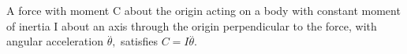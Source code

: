  A force with moment C about the origin acting on a body
with constant moment of inertia I about an axis through the origin 
perpendicular to the force, with angular acceleration 
$ \overset{..}{\theta} , $ satisfies $ C=I \overset{..}{\theta} . $
